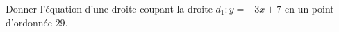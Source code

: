 
\begin{exercice}\label{exosmath-0622}

    Donner l'équation d'une droite coupant la droite \( d_1:y=-3x+7\) en un point d'ordonnée \( 29\).

\end{exercice}
